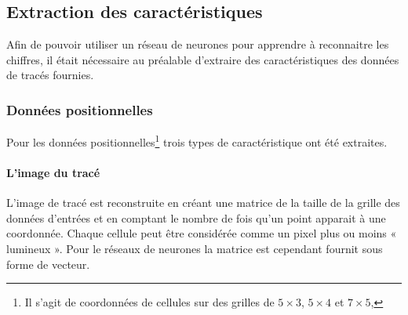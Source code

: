 \subsection{Extraction des caractéristiques}

Afin de pouvoir utiliser un réseau de neurones pour apprendre à reconnaitre les chiffres, il était nécessaire au préalable d'extraire des caractéristiques des données de tracés fournies.

\subsubsection{Données positionnelles} Pour les données positionnelles\footnote{Il s'agit de coordonnées de cellules sur des grilles de $5 \times 3$, $5 \times 4$ et $7 \times 5$,} trois types de caractéristique ont été extraites.

\paragraph{L'image du tracé} L'image de tracé est reconstruite en créant une matrice de la taille de la grille des données d'entrées et en comptant le nombre de fois qu'un point apparait à une coordonnée. Chaque cellule peut être considérée comme un pixel plus ou moins « lumineux ». Pour le réseaux de neurones la matrice est cependant fournit sous forme de vecteur.

